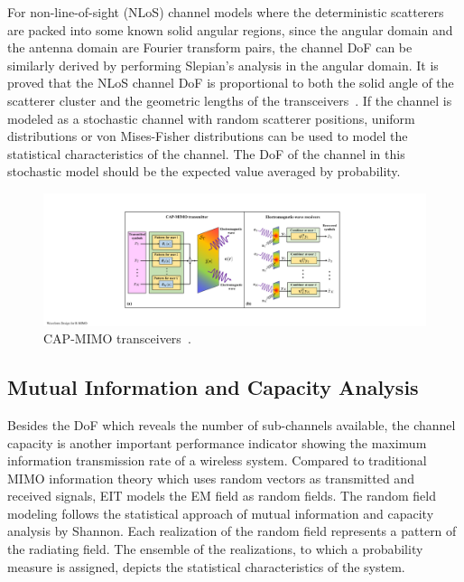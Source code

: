 \documentclass[journal,twocolumn]{IEEEtran}
\begin{document}
For non-line-of-sight (NLoS) channel models where the deterministic scatterers are packed into some known solid angular regions, since the angular domain and the antenna domain are Fourier transform pairs, the channel DoF can be similarly derived by performing Slepian's analysis in the angular domain. It is proved that the NLoS channel DoF is proportional to both the solid angle of the scatterer cluster and the geometric lengths of the transceivers~\cite{poon2005degrees}.  
If the channel is modeled as a stochastic channel with random scatterer positions, uniform distributions or von Mises-Fisher distributions can be used to model the statistical characteristics of the channel. 
The DoF of the channel in this stochastic model should be the expected value averaged by probability.

\begin{figure}[ht]
	\centering 
	\includegraphics[width=0.85\linewidth]{figures/CAPMIMO.pdf} 
	\caption{CAP-MIMO transceivers~\cite{zhang2022pdma}.  }
	\label{fig:CAPMIMO}
\end{figure}

\subsection{Mutual Information and Capacity Analysis}
Besides the DoF which reveals the number of sub-channels available, the channel capacity is another important performance indicator showing the maximum information transmission rate of a wireless system. Compared to traditional MIMO information theory which uses random vectors as transmitted and received signals, EIT models the EM field as random fields. The random field modeling follows the statistical approach of mutual information and capacity analysis by Shannon. Each realization of the random field represents a pattern of the radiating field. The ensemble of the realizations, to which a probability measure is assigned, depicts the statistical characteristics of the system. 
\end{document}
